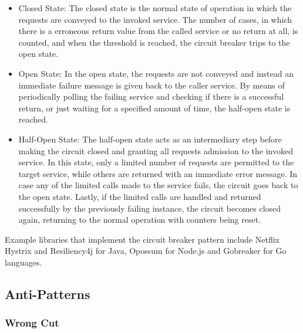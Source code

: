\documentclass{Configuration_Files/PoliMi3i_thesis}
\begin{document}
\begin{itemize}
    \item Closed State: The closed state is the normal state of operation in which the requests are conveyed to the invoked service. The number of cases, in which there is a erroneous return value from the called service or no return at all, is counted, and when the threshold is reached, the circuit breaker trips to the open state.
    
    \item Open State: In the open state, the requests are not conveyed and instead an immediate failure message is given back to the caller service. By means of periodically polling the failing service and checking if there is a successful return, or just waiting for a specified amount of time, the half-open state is reached.
    
    \item Half-Open State: The half-open state acts as an intermediary step before making the circuit closed and granting all requests admission to the invoked service. In this state, only a limited number of requests are permitted to the target service, while others are returned with an immediate error message. In case any of the limited calls made to the service fails, the circuit goes back to the open state. Lastly, if the limited calls are handled and returned successfully by the previously failing instance, the circuit becomes closed again, returning to the normal operation with counters being reset.
\end{itemize}

Example libraries that implement the circuit breaker pattern include Netflix Hystrix and Resiliency4j for Java, Opossum for Node.js and Gobreaker for Go languages.

\subsection{Anti-Patterns}
\label{subsec:antipattern}


\subsubsection{Wrong Cut}
\label{subsubsec:wrong_cut}
\end{document}
